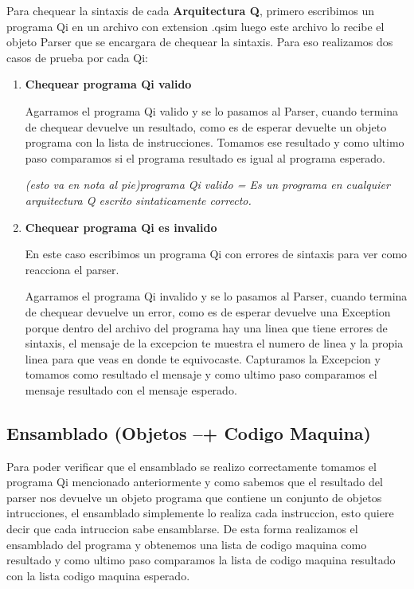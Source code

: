 Para chequear la sintaxis de cada \textbf{Arquitectura Q}, primero escribimos un programa Qi en un archivo con extension .qsim luego este archivo lo recibe el objeto Parser que se encargara de chequear la sintaxis. 
Para eso realizamos dos casos de prueba por cada Qi:
\begin{enumerate}
\item \textbf{Chequear programa Qi valido}

Agarramos el programa Qi valido y se lo pasamos al Parser, cuando termina de chequear devuelve un resultado, como es de esperar devuelte un objeto programa con la lista de instrucciones. Tomamos ese resultado y como ultimo paso comparamos si el programa resultado es igual al programa esperado.

\textit{ (esto va en nota al pie)programa Qi valido = Es un programa en cualquier arquitectura Q escrito sintaticamente correcto.}

\item \textbf{Chequear programa Qi es invalido} 

En este caso escribimos un programa Qi con errores de sintaxis para ver como reacciona el parser.

Agarramos el programa Qi invalido y se lo pasamos al Parser, cuando termina de chequear devuelve un error, como es de esperar devuelve una Exception porque dentro del archivo del programa hay una linea que tiene errores de sintaxis, el mensaje de la excepcion te muestra el numero de linea y la propia linea para que veas en donde te equivocaste. Capturamos la Excepcion y tomamos como resultado el mensaje y como ultimo paso comparamos el mensaje resultado con el mensaje esperado.
\end{enumerate}

\subsection{Ensamblado (Objetos --+ Codigo Maquina)}

Para poder verificar que el ensamblado se realizo correctamente tomamos el programa Qi mencionado anteriormente y como sabemos que el resultado del parser nos devuelve un objeto programa que contiene un conjunto de objetos intrucciones, el ensamblado simplemente lo realiza cada instruccion, esto quiere decir que cada intruccion sabe ensamblarse. De esta forma realizamos el ensamblado del programa y obtenemos una lista de codigo maquina como resultado y como ultimo paso comparamos la lista de codigo maquina resultado con la lista codigo maquina esperado.

